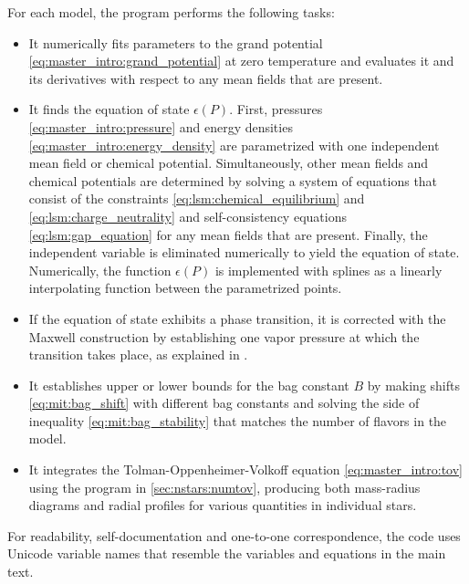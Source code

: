 For each model, the program performs the following tasks:
\begin{itemize}
\item It numerically fits parameters to the grand potential \eqref{eq:master_intro:grand_potential} at zero temperature
      and evaluates it and its derivatives with respect to any mean fields that are present.
\item It finds the equation of state $\epsilon(P)$.
      First, pressures \eqref{eq:master_intro:pressure} and energy densities \eqref{eq:master_intro:energy_density} are parametrized with one independent mean field or chemical potential.
      Simultaneously, other mean fields and chemical potentials are determined by solving a system of equations that consist of the constraints \eqref{eq:lsm:chemical_equilibrium} and \eqref{eq:lsm:charge_neutrality} and self-consistency equations \eqref{eq:lsm:gap_equation} for any mean fields that are present.
      Finally, the independent variable is eliminated numerically to yield the equation of state.
      Numerically, the function $\epsilon(P)$ is implemented with splines as a linearly interpolating function between the parametrized points.
\item If the equation of state exhibits a phase transition,
      it is corrected with the Maxwell construction
      by establishing one vapor pressure at which the transition takes place,
      as explained in \cite[equation 4.69]{ref:master_francesco}.
\item It establishes upper or lower bounds for the bag constant $B$
      by making shifts \eqref{eq:mit:bag_shift} with different bag constants
      and solving the side of inequality \eqref{eq:mit:bag_stability} that matches the number of flavors in the model.
\item It integrates the Tolman-Oppenheimer-Volkoff equation \eqref{eq:master_intro:tov}
      using the program in \cref{sec:nstars:numtov},
      producing both mass-radius diagrams and radial profiles for various quantities in individual stars.
\end{itemize}

For readability, self-documentation and one-to-one correspondence,
the code uses Unicode variable names that resemble the variables and equations in the main text.

\pagebreak

